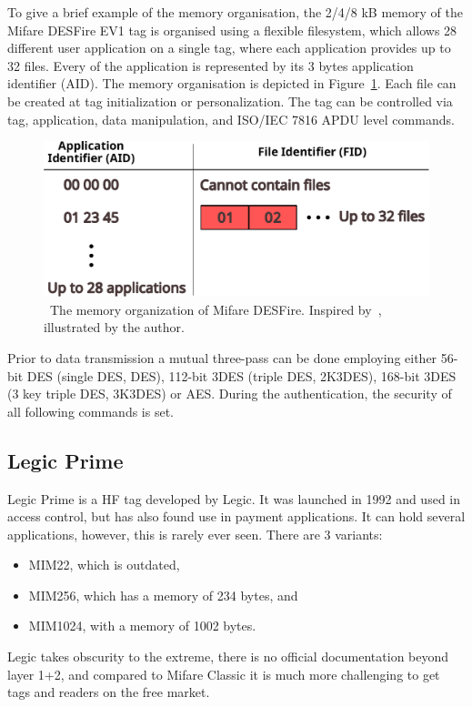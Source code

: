 To give a brief example of the memory organisation, the 2/4/8 kB memory of the Mifare DESFire EV1 tag is organised using a flexible filesystem, which allows 28 different user application on a single tag, where each application provides up to 32 files. Every of the application is represented by its 3 bytes application identifier (AID). The memory organisation is depicted in Figure~\ref{fig:desfirememory}. Each file can be created at tag initialization or personalization. The tag can be controlled via tag, application, data manipulation, and ISO/IEC 7816 APDU level commands.~\cite{desfiredatasheet, preucil2023surveying}

\begin{figure}[ht]
  \centering
  \includegraphics[width=12cm]{text/theoretical_background/desfire_memory.pdf}
  \caption[The memory organization of Mifare DESFire.]{~The memory organization of Mifare DESFire. Inspired by~\cite{desfirememory}, illustrated by the author.}
  \label{fig:desfirememory}
\end{figure}

Prior to data transmission a mutual three-pass can be done employing either 56-bit DES (single DES, DES), 112-bit 3DES (triple DES, 2K3DES), 168-bit 3DES (3 key triple DES, 3K3DES) or AES. During the authentication, the security of all following commands is set.~\cite{desfiredatasheet}


\subsection{Legic Prime}

Legic Prime is a HF tag developed by Legic. It was launched in 1992 and used in access control, but has also found use in payment applications. It can hold several applications, however, this is rarely ever seen. There are 3 variants:

\begin{itemize}
    \item MIM22, which is outdated,
    \item MIM256, which has a memory of 234 bytes, and
    \item MIM1024, with a memory of 1002 bytes.
\end{itemize}
Legic takes obscurity to the extreme, there is no official documentation beyond layer 1+2, and compared to Mifare Classic it is much more challenging to get tags and readers on the free market.~\cite{nohllegic}

